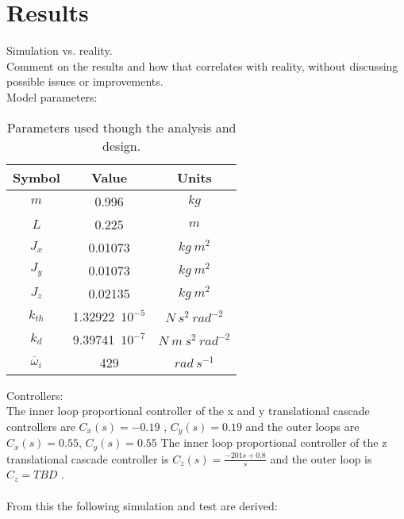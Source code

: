 \section{Results}

Simulation vs. reality. \\

Comment on the results and how that correlates with reality, without discussing possible issues or improvements.\\
Model parameters:

\begin{table}[H]
    \centering
    \begin{tabular}{c|c|c}
        \textbf{Symbol} &\textbf{Value} &\textbf{Units}\\
        \hline %
        $m$ & 0.996       &$kg$\\
        \hline %
        $L$  &   0.225       & $m$\\
        \hline %
        $J_x$  & 0.01073       & $kg \  m^2$\\
        \hline %
        $J_y$  & 0.01073       & $kg \  m^2$\\
        \hline %
        $J_z$  & 0.02135       & $kg \  m^2$\\
        \hline %
        $k_{th}$  & 1.32922\ $10^{-5}$       & $N \  s^2 \  rad^{-2}$\\
        \hline %
        $k_{d}$  & 9.39741\ $10^{-7}$       & $N \  m \  s^2 \  rad^{-2}$\\
        \hline %
        $\overline{\omega}_i$& 429      & $rad \ s^{-1}$\\
        
    \end{tabular}
    \caption{Parameters used though the analysis and design.}
    \label{ParametersQuadcopter}
\end{table}


Controllers:\\
The inner loop proportional controller of the x and y translational cascade controllers are $C_{\dot{x}}(s)= -0.19$
, $C_{\dot{y}}(s)= 0.19$ and the outer loops are $C_x(s)= 0.55$, $C_y(s)= 0.55$
The inner loop proportional controller of the z translational cascade controller is
$C_{\dot{z}}(s)=\frac{-201s+0.8}{s}$ and the outer loop is $C_z=TBD$ .\\ \\
From this the following simulation and test are derived: 